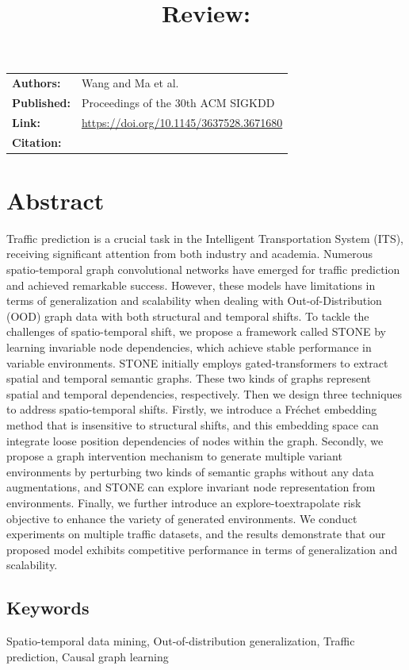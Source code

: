 \documentclass[11pt]{article}
\title{Review: \papertitle}
\author{}
\date{\reviewdate}
\newcommand{\paperauthors}{Wang and Ma et al.}
\newcommand{\papervenue}{Proceedings of the 30th ACM SIGKDD}
\newcommand{\paperlink}{\url{https://doi.org/10.1145/3637528.3671680}}
\begin{document}
\maketitle

\begin{tabular}{@{}ll@{}}
  \textbf{Authors:} & \paperauthors \\
  \textbf{Published:} & \papervenue \\
  \textbf{Link:} & \paperlink \\
  \textbf{Citation:} & \cite{wang_stone_2024} \\
\end{tabular}

\section{Abstract}
Traffic prediction is a crucial task in the Intelligent Transportation System (ITS), receiving significant attention from both industry and academia. Numerous spatio-temporal graph convolutional networks have emerged for traffic prediction and achieved remarkable success. However, these models have limitations in terms of generalization and scalability when dealing with Out-of-Distribution (OOD) graph data with both structural and temporal shifts. To tackle the challenges of spatio-temporal shift, we propose a framework called STONE by learning invariable node dependencies, which achieve stable performance in variable environments. STONE initially employs gated-transformers to extract spatial and temporal semantic graphs. These two kinds of graphs represent spatial and temporal dependencies, respectively. Then we design three techniques to address spatio-temporal shifts. Firstly, we introduce a Fréchet embedding method that is insensitive to structural shifts, and this embedding space can integrate loose position dependencies of nodes within the graph. Secondly, we propose a graph intervention mechanism to generate multiple variant environments by perturbing two kinds of semantic graphs without any data augmentations, and STONE can explore invariant node representation from environments. Finally, we further introduce an explore-toextrapolate risk objective to enhance the variety of generated environments. We conduct experiments on multiple traffic datasets, and the results demonstrate that our proposed model exhibits competitive performance in terms of generalization and scalability.

\subsection{Keywords}
Spatio-temporal data mining, Out-of-distribution generalization, Traffic prediction, Causal graph learning
\end{document}
